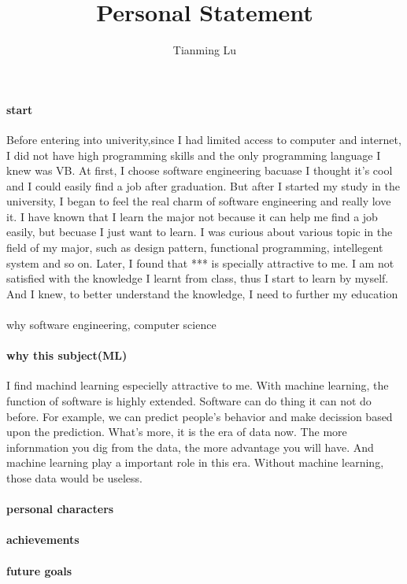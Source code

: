 \documentclass{article}
\title{Personal Statement}
\author{Tianming Lu}
\begin{document}
\maketitle
\paragraph{start}
Before entering into univerity,since I had limited access to computer and internet, I did not have high programming skills and the only programming language I knew was VB. At first, I choose software engineering bacuase I thought it's cool and I could easily find a job after graduation. But after I started my study in the university, I began to feel the real charm of software engineering and really love it. I have known that I learn the major not because it can help me find a job easily, but becuase I just want to learn. I was curious about various topic in the field of my major, such as design pattern, functional programming, intellegent system and so on.
Later, I found that *** is specially attractive to me. I am not satisfied with the knowledge I learnt from class, thus I start to learn by myself. And I knew, to better understand the knowledge, I need to further my education 
\paragraph{}
why software engineering, computer science
\paragraph{why this subject(ML)}
I find machind learning especielly attractive to me. With machine learning, the function of software is highly extended. Software can do thing it can not do before. For example, we can predict people's behavior and make decission based upon the prediction. What's more, it is the era of data now. The more infornmation you dig from the data, the more advantage you will have. And machine learning play a important role in this era. Without machine learning, those data would be useless. 
\paragraph{personal characters}

\paragraph{achievements}
\paragraph{future goals} 
\end{document}
